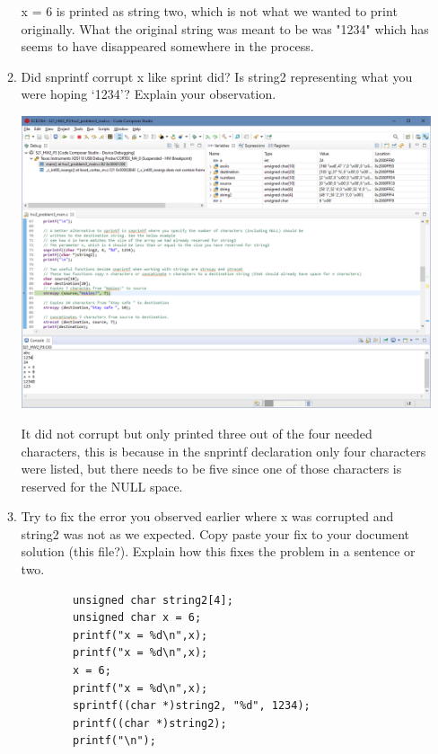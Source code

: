 \documentclass{article}
\begin{document}
\begin{enumerate}
\begin{enumerate}
\begin{center}
            x = 6 is printed as string two, which is not what we wanted to print originally. What the original string was meant to be was "1234" which has seems to have disappeared somewhere in the process.
        \end{center}
        \addtocounter{enumii}{1}
        \newpage
        \item Did  snprintf  corrupt  x  like  sprint  did?  Is  string2 representing what you were hoping ‘1234’? Explain your observation.
        \begin{center}
            \includegraphics[width = .9\textwidth]{3k.png}
            
            It did not corrupt but only printed three out of the four needed characters, this is because in the snprintf declaration only four characters were listed, but there needs to be five since one of those characters is reserved for the NULL space.
        \end{center}
        \item Try to fix the error you observed earlier where x was corrupted and string2 was not as we expected. Copy paste your fix to your document solution (this file?). Explain how this fixes the problem in a sentence or two.
        \begin{center}
        \lstset{language=C}
        \lstset{frame=lines}
        \lstset{basicstyle=\footnotesize}
        \begin{lstlisting}
        unsigned char string2[4];
        unsigned char x = 6;
        printf("x = %d\n",x);
        printf("x = %d\n",x);
        x = 6;
        printf("x = %d\n",x);
        sprintf((char *)string2, "%d", 1234);
        printf((char *)string2);
        printf("\n");
        \end{lstlisting}
        

\end{center}
\end{enumerate}
\end{enumerate}
\end{document}
